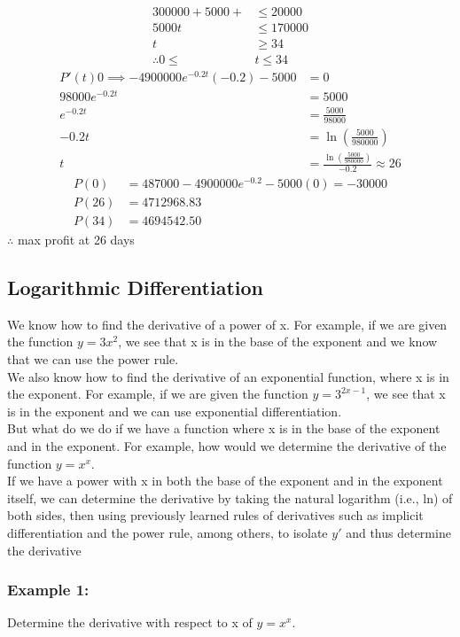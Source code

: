 \documentclass{article}
\begin{document}
\begin{enumerate}
\begin{align*}
        300000+5000+&\leq 20000\\
        5000t&\leq 170000\\
        t&\geq34\\
        \therefore 0\leq &t \leq 34
    \end{align*} 
    \begin{align*}
        P'(t) 0\implies -4900000e^{-0.2t}(-0.2)-5000&=0\\
        98000e^{-0.2t}&=5000\\
        e^{-0.2t}&=\frac{5000}{98000}\\
        -0.2t&=\ln \left(\frac{5000}{980000}\right)\\
        t&=\frac{\ln \left(\frac{5000}{980000}\right)}{-0.2} \approx 26
    \end{align*}
    \begin{align*}
        P(0)&=487000-4900000e^{-0.2}-5000(0)=-30000\\
        P(26)&=4712968.83\\
        P(34)&=4694542.50
    \end{align*}
    $\therefore$ max profit at 26 days
\end{enumerate}
\newpage 
\subsection{Logarithmic Differentiation}
We know how to find the derivative of a power of x. For example, if we are given the function $y=3x^2$, we see that x is in the base of the exponent and we know that we can use the power rule.\\
We also know how to find the derivative of an exponential function, where x is in the exponent. For example, if we are given the function $y=3^{2x-1}$, we see that x is in the exponent and we can use exponential differentiation.\\
But what do we do if we have a function where x is in the base of the exponent and in the exponent. For example, how would we determine the derivative of the function $y=x^x$. \\
If we have a power with x in both the base of the exponent and in the exponent itself, we can determine the derivative by taking the natural logarithm (i.e., ln) of both sides, then using previously learned rules of derivatives such as implicit differentiation and the power rule, among others, to isolate $y'$ and thus determine the derivative

\subsubsection*{Example 1:}
Determine the derivative with respect to x of $y=x^x$.
\end{document}
